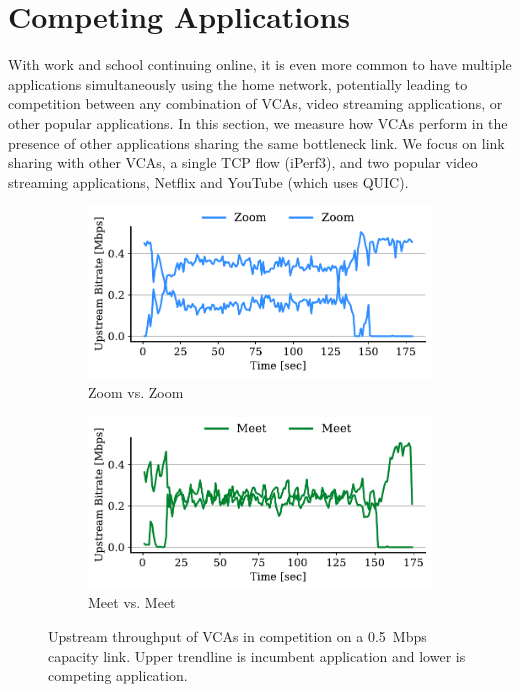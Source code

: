 \section{Competing Applications}
\label{sec:competition}

With work and school continuing online, it is even more common to have multiple
applications simultaneously using the home network, potentially leading to
competition between any combination of VCAs, video streaming applications, or other popular
applications. In this section, we measure how VCAs perform in the presence of
other applications sharing the same bottleneck link. We focus on
link sharing with other VCAs, a single TCP flow (iPerf3), and two popular
video streaming applications, Netflix and YouTube (which uses QUIC).


\begin{figure}[t!]
\centering
\begin{subfigure}[t]{.4\textwidth}
    \centering
    \includegraphics[width=1\textwidth]{figures/comp_ts/zoom_zoom_0.5_ul_r2.pdf}
    \caption{Zoom vs. Zoom}
    \label{subfig:zoom_zoom_0_5}
\end{subfigure}\hfill
\begin{subfigure}[t]{.4\textwidth}
    \centering
    \includegraphics[width=1\textwidth]{figures/comp/meet_meet_0.5_ul_r1.pdf}
    \caption{Meet vs. Meet}
    \label{subfig:meet_meet_0_5}
\end{subfigure}
\caption{Upstream throughput of VCAs in competition on a 0.5~Mbps capacity link. Upper trendline is incumbent application and lower is competing application.}
\label{fig:meet-zoom-upld-0.5}
\end{figure}

